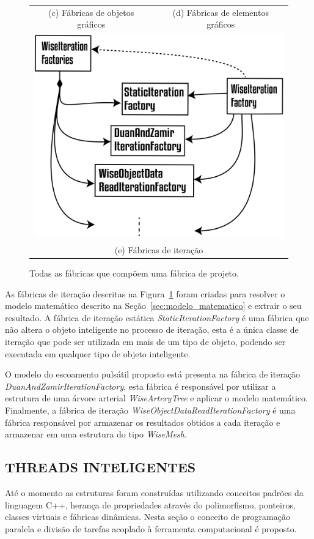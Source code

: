 \begin{figure}
\begin{tabularx}{\textwidth}{cc}
		(c) Fábricas de objetos gráficos & (d) Fábricas de elementos gráficos \\[6pt]
		\multicolumn{2}{c}{\includegraphics[width=0.5\linewidth]{Figures/WiseIterationFactories@16x.png} }\\
		\multicolumn{2}{c}{(e) Fábricas de iteração}
	\end{tabularx}
	\caption{Todas as fábricas que compõem uma fábrica de projeto.}
	\label{tab:factories} 
\end{figure}

 As fábricas de iteração descritas na Figura~\ref{tab:factories} foram criadas para resolver o modelo matemático descrito na Seção~\ref{sec:modelo_matematico} e extrair o seu resultado. A fábrica de iteração estática \textit{StaticIterationFactory} é uma fábrica que não altera o objeto inteligente no processo de iteração, esta é a única classe de iteração que pode ser utilizada em mais de um tipo de objeto, podendo ser executada em qualquer tipo de objeto inteligente.

O modelo do escoamento pulsátil proposto está presenta na fábrica de iteração \textit{DuanAndZamirIterationFactory}, esta fábrica é responsável por utilizar a estrutura de uma árvore arterial \textit{WiseArteryTree} e aplicar o modelo matemático. Finalmente, a fábrica de iteração \textit{WiseObjectDataReadIterationFactory} é uma fábrica responsável por armazenar os resultados obtidos a cada iteração e armazenar em uma estrutura do tipo \textit{WiseMesh}.

\subsection{THREADS INTELIGENTES}\label{sec:threads}

Até o momento as estruturas foram construídas utilizando conceitos padrões da linguagem C++, herança de propriedades através do polimorfismo, ponteiros, classes virtuais e fábricas dinâmicas. Nesta seção o conceito de programação paralela e divisão de tarefas acoplado à ferramenta computacional é proposto.

